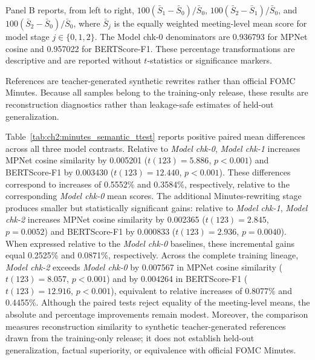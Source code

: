 \begin{table}[H]
\begin{threeparttable}
\begin{tablenotes}[flushleft]
            Panel B reports, from left to right,
            \(100(\bar{S}_{1}-\bar{S}_{0})/\bar{S}_{0}\),
            \(100(\bar{S}_{2}-\bar{S}_{1})/\bar{S}_{0}\), and
            \(100(\bar{S}_{2}-\bar{S}_{0})/\bar{S}_{0}\), where
            \(\bar{S}_{j}\) is the equally weighted meeting-level mean score
            for model stage \(j\in\{0,1,2\}\). The Model chk-0 denominators are
            0.936793 for MPNet cosine and 0.957022 for BERTScore-F1. These
            percentage transformations are descriptive and are reported
            without \(t\)-statistics or significance markers.

            References are teacher-generated synthetic rewrites rather than
            official FOMC Minutes. Because all samples belong to the
            training-only release, these results are reconstruction
            diagnostics rather than leakage-safe estimates of held-out
            generalization.
        \end{tablenotes}
    \end{threeparttable}
\end{table}


Table~\ref{tab:ch2:minutes_semantic_ttest} reports positive paired mean differences across all three model contrasts. Relative to \textit{Model chk-0}, \textit{Model chk-1} increases MPNet cosine similarity by 0.005201 (\(t(123)=5.886\), \(p<0.001\)) and BERTScore-F1 by 0.003430 (\(t(123)=12.440\), \(p<0.001\)). These differences correspond to increases of 0.5552\% and 0.3584\%, respectively, relative to the corresponding \textit{Model chk-0} mean scores. The additional Minutes-rewriting stage produces smaller but statistically significant gains: relative to \textit{Model chk-1}, \textit{Model chk-2} increases MPNet cosine similarity by 0.002365 (\(t(123)=2.845\), \(p=0.0052\)) and BERTScore-F1 by 0.000833 (\(t(123)=2.936\), \(p=0.0040\)). When expressed relative to the \textit{Model chk-0} baselines, these incremental gains equal 0.2525\% and 0.0871\%, respectively. Across the complete training lineage, \textit{Model chk-2} exceeds \textit{Model chk-0} by 0.007567 in MPNet cosine similarity (\(t(123)=8.057\), \(p<0.001\)) and by 0.004264 in BERTScore-F1 (\(t(123)=12.916\), \(p<0.001\)), equivalent to relative increases of 0.8077\% and 0.4455\%. Although the paired tests reject equality of the meeting-level means, the absolute and percentage improvements remain modest. Moreover, the comparison measures reconstruction similarity to synthetic teacher-generated references drawn from the training-only release; it does not establish held-out generalization, factual superiority, or equivalence with official FOMC Minutes.

